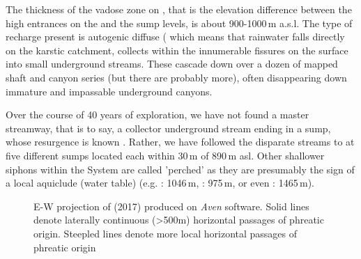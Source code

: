The thickness of the vadose zone on , that is the elevation difference between the high entrances on the  and the sump levels, is about 900-1000\,m a.s.l. The type of recharge present is autogenic diffuse (\citep{ford2013karst} which means that rainwater falls directly on the karstic catchment, collects within the innumerable fissures on the surface into small underground streams. These cascade down over a dozen of mapped shaft and canyon series (but there are probably more), often disappearing down immature and impassable underground canyons. 

Over the course of 40 years of exploration, we have not found a master streamway, that is to say, a collector underground stream ending in a sump, whose resurgence is known \citep{hm1}. Rather, we have followed the disparate streams to at five different sumps located each within 30\,m of 890\,m asl. Other shallower siphons within the System are called 'perched'  as they are presumably the sign of a local aquiclude (water table) (e.g. : 1046\,m, : 975\,m, or even : 1465\,m).

\begin{figure}[t!]
 \checkoddpage \ifoddpage \forcerectofloat \else \forceversofloat \fi
\centering
{}
\caption{E-W projection of \protect{} (2017) produced on \emph{Aven} software. Solid lines denote laterally continuous (>500m) horizontal passages of phreatic origin. Steepled lines denote more local horizontal passages of phreatic origin} \label{fig:ew projection}
\end{figure}



